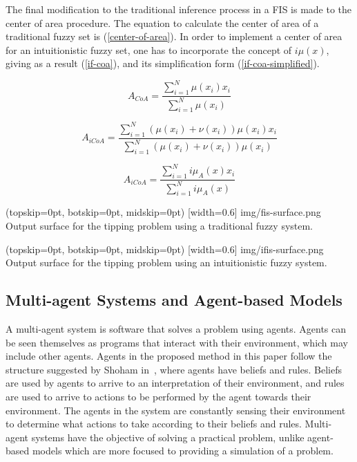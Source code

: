 \documentclass{ieeeaccess}
\begin{document}
The final modification to the traditional inference process in a FIS is made to
the center of area procedure. The equation to calculate the center of area of a
traditional fuzzy set is (\ref{center-of-area}). In order to implement a center
of area for an intuitionistic fuzzy set, one has to incorporate the concept of
$i\mu(x)$, giving as a result (\ref{if-coa}), and its simplification form
(\ref{if-coa-simplified}).

\begin{equation}
  \label{center-of-area}
  A_{CoA} = \dfrac{\sum_{i=1}^{N} \mu(x_{i})
    x_{i}}{\sum_{i=1}^{N} \mu(x_{i})}
\end{equation}

\begin{equation}
  \label{if-coa}
  A_{iCoA} = \dfrac{\sum_{i=1}^{N} (\mu(x_{i}) + \nu(x_{i})) \mu(x_{i})
    x_{i}}{\sum_{i=1}^{N} (\mu(x_{i}) + \nu(x_{i})) \mu(x_{i})}
\end{equation}

\begin{equation}
  \label{if-coa-simplified}
  A_{iCoA} = \dfrac{\sum_{i=1}^{N} i\mu_{A}(x) x_{i}}{\sum_{i=1}^{N}
    i\mu_{A}(x)}
\end{equation}

\Figure[](topskip=0pt, botskip=0pt, midskip=0pt)
[width=0.6\linewidth]
{img/fis-surface.png}
{Output surface for the tipping problem using a traditional fuzzy system.
  \label{figure:tipping-output-surface}}

\Figure[](topskip=0pt, botskip=0pt, midskip=0pt)
[width=0.6\linewidth]
{img/ifis-surface.png}
{Output surface for the tipping problem using an intuitionistic fuzzy system.
  \label{figure:ifis-tipping-output-surface}}

\subsection{Multi-agent Systems and Agent-based Models}
\label{subsection:multi-agent-system}

A multi-agent system is software that solves a problem using agents. Agents can
be seen themselves as programs that interact with their environment, which may
include other agents. Agents in the proposed method in this paper follow the
structure suggested by Shoham in~\cite{Shoham1993}, where agents have
beliefs and rules. Beliefs are used by agents to arrive to an interpretation of
their environment, and rules are used to arrive to actions to be performed by
the agent towards their environment. The agents in the system are constantly
sensing their environment to determine what actions to take according to their
beliefs and rules. Multi-agent systems have the objective of solving a practical
problem, unlike agent-based models which are more focused to providing a
simulation of a problem.
\end{document}

